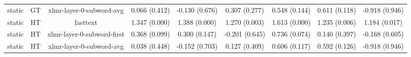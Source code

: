 \begin{sidewaystable}[htb]
\begin{tabular}{@{}ccccccccc@{}}
        static & GT & xlmr-layer-0-subword-avg & 0.066 (0.412) & -0.130 (0.676) & 0.307 (0.277) & 0.548 (0.144) & 0.611 (0.118) & -0.918 (0.946) \\
        static & HT & fasttext & 1.347 (0.000) & 1.388 (0.000) & 1.270 (0.003) & 1.613 (0.000) & 1.235 (0.006) & 1.184 (0.017) \\
        static & HT & xlmr-layer-0-subword-first & 0.368 (0.099) & 0.300 (0.147) & -0.201 (0.645) & 0.736 (0.074) & 0.140 (0.397) & -0.168 (0.605) \\
        static & HT & xlmr-layer-0-subword-avg & 0.038 (0.448) & -0.152 (0.703) & 0.127 (0.409) & 0.606 (0.117) & 0.592 (0.126) & -0.918 (0.946) \\
        \bottomrule
    \end{tabular}
\end{sidewaystable}